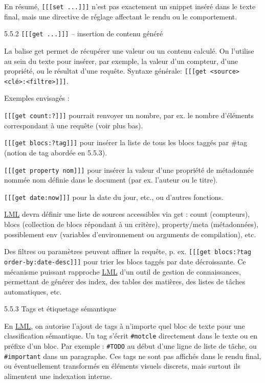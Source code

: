 \documentclass[a4paper,12pt]{article}
\begin{document}
En résumé, \texttt{[[[set ...]]]} n’est pas exactement un snippet inséré dans le texte final, mais une directive de réglage affectant le rendu ou le comportement.

5.5.2 \texttt{[[[get ...]]]} – insertion de contenu généré

La balise get permet de récupérer une valeur ou un contenu calculé. On l’utilise au sein du texte pour insérer, par exemple, la valeur d’un compteur, d’une propriété, ou le résultat d’une requête. Syntaxe générale: \texttt{[[[get <source> <clé>:<filtre>]]]}.

Exemples envisagés :

\texttt{[[[get count:?]]]} pourrait renvoyer un nombre, par ex. le nombre d’éléments correspondant à une requête (voir plus bas).

\texttt{[[[get blocs:?tag]]]} pour insérer la liste de tous les blocs taggés par \#tag (notion de tag abordée en 5.5.3).

\texttt{[[[get property nom]]]} pour insérer la valeur d’une propriété de métadonnée nommée nom définie dans le document (par ex. l’auteur ou le titre).

\texttt{[[[get date:now]]]} pour la date du jour, etc., ou d’autres fonctions.

\protect\hyperlink{gls-2}{\label{gls-2-use-16}LML} devra définir une liste de sources accessibles via get : count (compteurs), blocs (collection de blocs répondant à un critère), property/meta (métadonnées), possiblement env (variables d’environnement ou arguments de compilation), etc.

Des filtres ou paramètres peuvent affiner la requête, p. ex. \texttt{[[[get blocs:?tag order-by:date-desc]]]} pour trier les blocs taggés par date décroissante. Ce mécanisme puissant rapproche \protect\hyperlink{gls-2}{\label{gls-2-use-17}LML} d’un outil de gestion de connaissances, permettant de générer des index, des tables des matières, des listes de tâches automatiques, etc.

5.5.3 Tags et étiquetage sémantique

En \protect\hyperlink{gls-2}{\label{gls-2-use-18}LML}, on autorise l’ajout de tags à n’importe quel bloc de texte pour une classification sémantique. Un tag s’écrit \texttt{\#motcle} directement dans le texte ou en préfixe d’un bloc. Par exemple : \texttt{\#TODO} au début d’une ligne de liste de tâche, ou \texttt{\#important} dans un paragraphe. Ces tags ne sont pas affichés dans le rendu final, ou éventuellement transformés en éléments visuels discrets, mais surtout ils alimentent une indexation interne.
\end{document}
